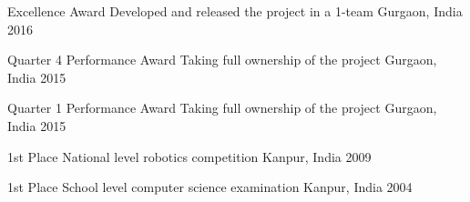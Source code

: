 



\begin{cvhonors}

  \cvhonor
    {Excellence Award} %
    {Developed and released the project in a 1-team} %
    {Gurgaon, India} %
    {2016} %

  \cvhonor
    {Quarter 4 Performance Award} %
    {Taking full ownership of the project} %
    {Gurgaon, India} %
    {2015} %

  \cvhonor
    {Quarter 1 Performance Award} %
    {Taking full ownership of the project} %
    {Gurgaon, India} %
    {2015} %

\end{cvhonors}




\begin{cvhonors}

  \cvhonor
    {1st Place} %
    {National level robotics competition} %
    {Kanpur, India} %
    {2009} %

  \cvhonor
    {1st Place} %
    {School level computer science examination} %
    {Kanpur, India} %
    {2004} %

\end{cvhonors}


